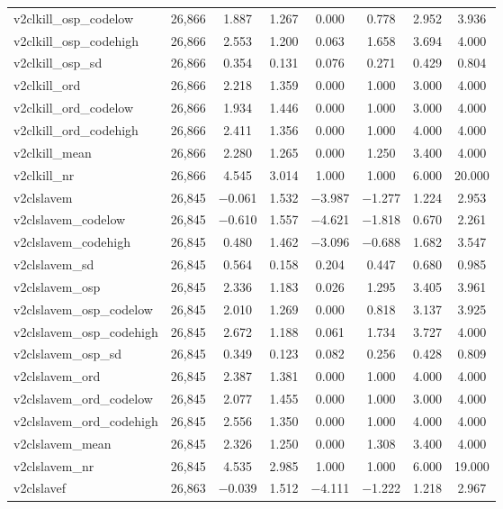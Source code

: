 \begin{table}[!htbp]
\begin{tabular}{@{\extracolsep{5pt}}lccccccc}
v2clkill\_osp\_codelow & 26,866 & 1.887 & 1.267 & 0.000 & 0.778 & 2.952 & 3.936 \\ 
v2clkill\_osp\_codehigh & 26,866 & 2.553 & 1.200 & 0.063 & 1.658 & 3.694 & 4.000 \\ 
v2clkill\_osp\_sd & 26,866 & 0.354 & 0.131 & 0.076 & 0.271 & 0.429 & 0.804 \\ 
v2clkill\_ord & 26,866 & 2.218 & 1.359 & 0.000 & 1.000 & 3.000 & 4.000 \\ 
v2clkill\_ord\_codelow & 26,866 & 1.934 & 1.446 & 0.000 & 1.000 & 3.000 & 4.000 \\ 
v2clkill\_ord\_codehigh & 26,866 & 2.411 & 1.356 & 0.000 & 1.000 & 4.000 & 4.000 \\ 
v2clkill\_mean & 26,866 & 2.280 & 1.265 & 0.000 & 1.250 & 3.400 & 4.000 \\ 
v2clkill\_nr & 26,866 & 4.545 & 3.014 & 1.000 & 1.000 & 6.000 & 20.000 \\ 
v2clslavem & 26,845 & $-$0.061 & 1.532 & $-$3.987 & $-$1.277 & 1.224 & 2.953 \\ 
v2clslavem\_codelow & 26,845 & $-$0.610 & 1.557 & $-$4.621 & $-$1.818 & 0.670 & 2.261 \\ 
v2clslavem\_codehigh & 26,845 & 0.480 & 1.462 & $-$3.096 & $-$0.688 & 1.682 & 3.547 \\ 
v2clslavem\_sd & 26,845 & 0.564 & 0.158 & 0.204 & 0.447 & 0.680 & 0.985 \\ 
v2clslavem\_osp & 26,845 & 2.336 & 1.183 & 0.026 & 1.295 & 3.405 & 3.961 \\ 
v2clslavem\_osp\_codelow & 26,845 & 2.010 & 1.269 & 0.000 & 0.818 & 3.137 & 3.925 \\ 
v2clslavem\_osp\_codehigh & 26,845 & 2.672 & 1.188 & 0.061 & 1.734 & 3.727 & 4.000 \\ 
v2clslavem\_osp\_sd & 26,845 & 0.349 & 0.123 & 0.082 & 0.256 & 0.428 & 0.809 \\ 
v2clslavem\_ord & 26,845 & 2.387 & 1.381 & 0.000 & 1.000 & 4.000 & 4.000 \\ 
v2clslavem\_ord\_codelow & 26,845 & 2.077 & 1.455 & 0.000 & 1.000 & 3.000 & 4.000 \\ 
v2clslavem\_ord\_codehigh & 26,845 & 2.556 & 1.350 & 0.000 & 1.000 & 4.000 & 4.000 \\ 
v2clslavem\_mean & 26,845 & 2.326 & 1.250 & 0.000 & 1.308 & 3.400 & 4.000 \\ 
v2clslavem\_nr & 26,845 & 4.535 & 2.985 & 1.000 & 1.000 & 6.000 & 19.000 \\ 
v2clslavef & 26,863 & $-$0.039 & 1.512 & $-$4.111 & $-$1.222 & 1.218 & 2.967 \\ 

\end{tabular}
\end{table}
